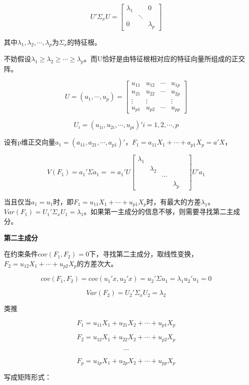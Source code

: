 \documentclass[]{ctexbook}
\begin{document}
\[U'\Sigma_x U=\begin {bmatrix} \lambda_1 & & 0 \\  & \ddots  & \\ 0 & & \lambda_p \end {bmatrix}\]

其中\(\lambda_1,\lambda_2,\cdots,\lambda_p\)为\(\Sigma_x\)的特征根。

不妨假设\(\lambda_1\ge \lambda_2\ge \cdots \ge \lambda_p\)。而U恰好是由特征根相对应的特征向量所组成的正交阵。

\[U=(u_1,\cdots,u_p)=\begin {bmatrix} u_{11} & u_{12} & \cdots & u_{1p} \\ u_{21} & u_{22} & \cdots & u_{2p} \\ \vdots & \vdots & & \vdots \\ u_{p1} & u_{p2} & \cdots & u_{pp} \end {bmatrix}\]

\[U_i=(u_{1i},u_{2i},\cdots,u_{pi})' i=1,2,\cdots,p\]

设有p维正交向量\(a_1=(a_{11},a_{21},\cdots,a_{p1})'\)，\(F_1=a_{11}X_1+\cdots+a_{p1}X_p=a'X\)，

\[V(F_1)=a_1'\Sigma a_1==a_1'U\begin {bmatrix} \lambda_1 & & & \\ & \lambda_2 & & \\ & & \cdots & & \\ & & & \lambda_p &\end {bmatrix}U'a_1\]

当且仅当\(a_1=u_1\)时，即\(F_1=u_{11}X_1+\cdots+u_{p1}X_p\)时，有最大的方差\(\lambda_1\)。\(Var(F_1)=U_1'\Sigma_x U_1=\lambda_1\)。如果第一主成分的信息不够，则需要寻找第二主成分。

\textbf{第二主成分}

在约束条件\(cov(F_1,F_2)=0\)下，寻找第二主成分，取线性变换，\(F_2=u_{12}X_1+\cdots+u_{p2}X_p\)的方差次大。

\[cov(F_1,F_2)=cov(u_1'x,u_2'x)=u_2'\Sigma u_1=\lambda_1 u_2'u_1=0\]

\[Var(F_2)=U_2'\Sigma_x U_2=\lambda_2\]

类推

\[F_1=u_{11}X_1+u_{21}X_2+\cdots+u_{p1}X_p\]

\[F_2=u_{12}X_1+u_{22}X_2+\cdots+u_{p2}X_p\]

\[\cdots\]

\[F_p=u_{1p}X_1+u_{2p}X_2+\cdots+u_{pp}X_p\]

写成矩阵形式：
\end{document}
